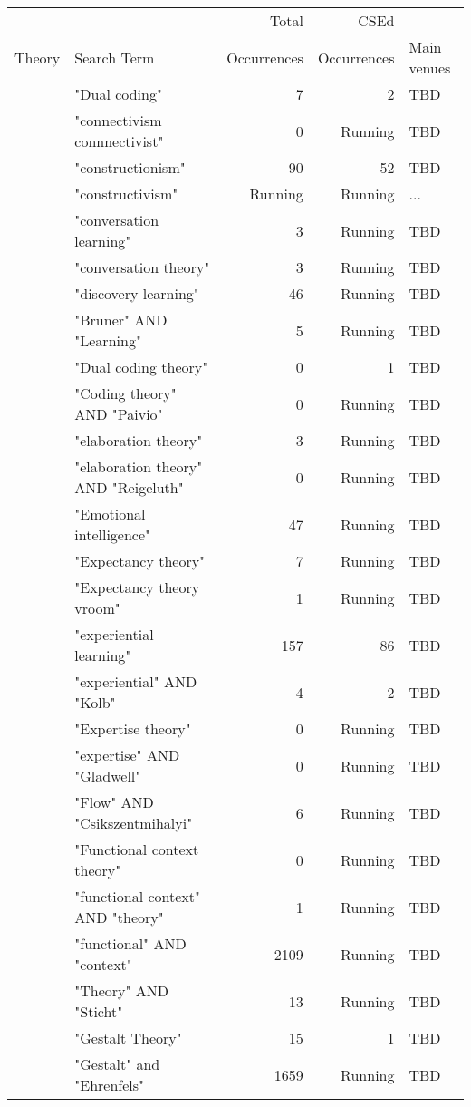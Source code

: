\begin{table*}[t]
\begin{tabular}{lp{7cm}rrp{3cm}}
& & Total & CSEd & \\Theory & Search Term & Occurrences & Occurrences & Main venues\\\hline
& "Dual coding" & 7 & 2 & TBD \\
& "connectivism connnectivist" & 0 & Running & TBD \\
& "constructionism" & 90 & 52 & TBD \\
& "constructivism" & Running & Running & ... \\
& "conversation learning" & 3 & Running & TBD \\
& "conversation theory" & 3 & Running & TBD \\
& "discovery learning" & 46 & Running & TBD \\
& "Bruner" AND "Learning" & 5 & Running & TBD \\
& "Dual coding theory" & 0 & 1 & TBD \\
& "Coding theory" AND "Paivio" & 0 & Running & TBD \\
& "elaboration theory" & 3 & Running & TBD \\
& "elaboration theory" AND "Reigeluth" & 0 & Running & TBD \\
& "Emotional intelligence" & 47 & Running & TBD \\
& "Expectancy theory" & 7 & Running & TBD \\
& "Expectancy theory vroom" & 1 & Running & TBD \\
& "experiential learning" & 157 & 86 & TBD \\
& "experiential" AND "Kolb" & 4 & 2 & TBD \\
& "Expertise theory" & 0 & Running & TBD \\
& "expertise" AND "Gladwell" & 0 & Running & TBD \\
& "Flow" AND "Csikszentmihalyi" & 6 & Running & TBD \\
& "Functional context theory" & 0 & Running & TBD \\
& "functional context" AND "theory" & 1 & Running & TBD \\
& "functional" AND "context" & 2109 & Running & TBD \\
& "Theory" AND "Sticht" & 13 & Running & TBD \\
& "Gestalt Theory" & 15 & 1 & TBD \\
& "Gestalt" and "Ehrenfels" & 1659 & Running & TBD \\

\end{tabular}
\end{table*}
